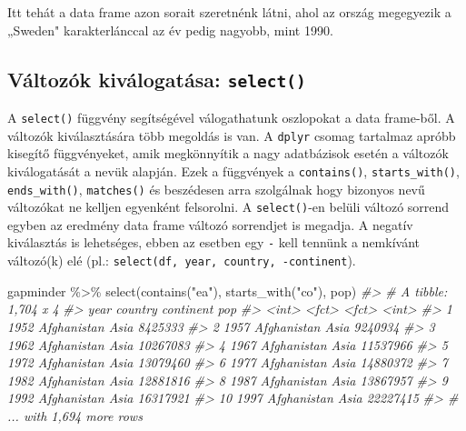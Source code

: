 \documentclass[
]{book}
\newenvironment{Shaded}{\begin{snugshade}}{\end{snugshade}}
\newcommand{\CommentTok}[1]{\textcolor[rgb]{0.56,0.35,0.01}{\textit{#1}}}
\newcommand{\FunctionTok}[1]{\textcolor[rgb]{0.00,0.00,0.00}{#1}}
\newcommand{\NormalTok}[1]{#1}
\newcommand{\SpecialCharTok}[1]{\textcolor[rgb]{0.00,0.00,0.00}{#1}}
\newcommand{\StringTok}[1]{\textcolor[rgb]{0.31,0.60,0.02}{#1}}
\begin{document}
Itt tehát a data frame azon sorait szeretnénk látni, ahol az ország
megegyezik a „Sweden" karakterlánccal az év pedig nagyobb, mint 1990.

\hypertarget{vuxe1ltozuxf3k-kivuxe1logatuxe1sa-select}{%
\subsection{\texorpdfstring{Változók kiválogatása:
\texttt{select()}}{Változók kiválogatása: select()}}\label{vuxe1ltozuxf3k-kivuxe1logatuxe1sa-select}}

A \texttt{select()} függvény segítségével válogathatunk oszlopokat a
data frame-ből. A változók kiválasztására több megoldás is van. A
\texttt{dplyr} csomag tartalmaz apróbb kisegítő függvényeket, amik
megkönnyítik a nagy adatbázisok esetén a változók kiválogatását a nevük
alapján. Ezek a függvények a \texttt{contains()},
\texttt{starts\_with()}, \texttt{ends\_with()}, \texttt{matches()} és
beszédesen arra szolgálnak hogy bizonyos nevű változókat ne kelljen
egyenként felsorolni. A \texttt{select()}-en belüli változó sorrend
egyben az eredmény data frame változó sorrendjet is megadja. A negatív
kiválasztás is lehetséges, ebben az esetben egy \texttt{-} kell tennünk
a nemkívánt változó(k) elé (pl.:
\texttt{select(df,\ year,\ country,\ -continent}).

\begin{Shaded}
\begin{Highlighting}[]
\NormalTok{gapminder }\SpecialCharTok{\%\textgreater{}\%}
  \FunctionTok{select}\NormalTok{(}\FunctionTok{contains}\NormalTok{(}\StringTok{"ea"}\NormalTok{), }\FunctionTok{starts\_with}\NormalTok{(}\StringTok{"co"}\NormalTok{), pop)}
\CommentTok{\#\textgreater{} \# A tibble: 1,704 x 4}
\CommentTok{\#\textgreater{}     year country     continent      pop}
\CommentTok{\#\textgreater{}    \textless{}int\textgreater{} \textless{}fct\textgreater{}       \textless{}fct\textgreater{}        \textless{}int\textgreater{}}
\CommentTok{\#\textgreater{}  1  1952 Afghanistan Asia       8425333}
\CommentTok{\#\textgreater{}  2  1957 Afghanistan Asia       9240934}
\CommentTok{\#\textgreater{}  3  1962 Afghanistan Asia      10267083}
\CommentTok{\#\textgreater{}  4  1967 Afghanistan Asia      11537966}
\CommentTok{\#\textgreater{}  5  1972 Afghanistan Asia      13079460}
\CommentTok{\#\textgreater{}  6  1977 Afghanistan Asia      14880372}
\CommentTok{\#\textgreater{}  7  1982 Afghanistan Asia      12881816}
\CommentTok{\#\textgreater{}  8  1987 Afghanistan Asia      13867957}
\CommentTok{\#\textgreater{}  9  1992 Afghanistan Asia      16317921}
\CommentTok{\#\textgreater{} 10  1997 Afghanistan Asia      22227415}
\CommentTok{\#\textgreater{} \# ... with 1,694 more rows}
\end{Highlighting}
\end{Shaded}
\end{document}
